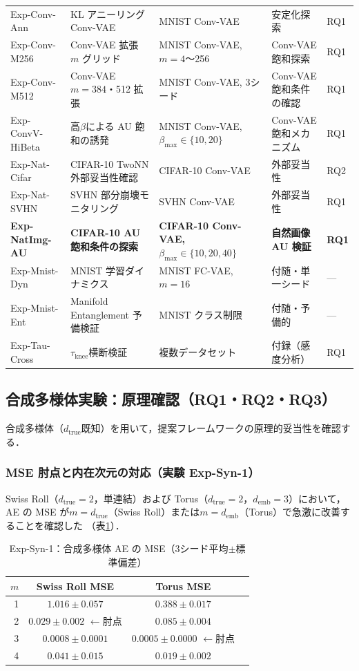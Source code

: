 \documentclass[11pt,a4paper]{jsarticle}
\newcommand{\dtrue}{d_{\mathrm{true}}}
\newcommand{\demb}{d_{\mathrm{emb}}}
\begin{document}
\begin{table}[H]
\begin{tabular}{lllll}
Exp-Conv-Ann & KL アニーリング Conv-VAE & MNIST Conv-VAE & 安定化探索 & RQ1 \\
Exp-Conv-M256 & Conv-VAE 拡張 $m$ グリッド & MNIST Conv-VAE, $m=4$〜256 & Conv-VAE 飽和探索 & RQ1 \\
Exp-Conv-M512 & Conv-VAE $m=384$・512 拡張 & MNIST Conv-VAE, 3シード & Conv-VAE 飽和条件の確認 & RQ1 \\
Exp-ConvV-HiBeta & 高$\beta$による AU 飽和の誘発 & MNIST Conv-VAE, $\beta_{\max}\in\{10,20\}$ & Conv-VAE 飽和メカニズム & RQ1 \\
Exp-Nat-Cifar & CIFAR-10 TwoNN 外部妥当性確認 & CIFAR-10 Conv-VAE & 外部妥当性 & RQ2 \\
Exp-Nat-SVHN & SVHN 部分崩壊モニタリング & SVHN Conv-VAE & 外部妥当性 & RQ1 \\
\textbf{Exp-NatImg-AU} & \textbf{CIFAR-10 AU 飽和条件の探索} & \textbf{CIFAR-10 Conv-VAE, $\beta_{\max}\in\{10,20,40\}$} & \textbf{自然画像 AU 検証} & \textbf{RQ1} \\
Exp-Mnist-Dyn & MNIST 学習ダイナミクス & MNIST FC-VAE, $m=16$ & 付随・単一シード & --- \\
Exp-Mnist-Ent & Manifold Entanglement 予備検証 & MNIST クラス制限 & 付随・予備的 & --- \\
Exp-Tau-Cross & $\tau_\mathrm{knee}$横断検証 & 複数データセット & 付録（感度分析） & RQ1 \\
\bottomrule
\end{tabular}
\end{table}

\subsection{合成多様体実験：原理確認（RQ1・RQ2・RQ3）}\label{sec:exp_synthetic}

合成多様体（$\dtrue$既知）を用いて，提案フレームワークの原理的妥当性を確認する．

\subsubsection{MSE 肘点と内在次元の対応（実験 Exp-Syn-1）}

Swiss Roll（$\dtrue = 2$，単連結）および Torus（$\dtrue = 2$，$\demb = 3$）において，
AE の MSE が$m = \dtrue$（Swiss Roll）または$m = \demb$（Torus）で急激に改善することを確認した
（表\ref{tab:e1}）．

\begin{table}[H]
\centering
\caption{Exp-Syn-1：合成多様体 AE の MSE（3シード平均$\pm$標準偏差）}
\label{tab:e1}
\small
\begin{tabular}{rccc}
\toprule
$m$ & Swiss Roll MSE & Torus MSE \\
\midrule
1 & $1.016\pm0.057$ & $0.388\pm0.017$ \\
2 & $\boldsymbol{0.029\pm0.002}$ $\leftarrow$肘点 & $0.085\pm0.004$ \\
3 & $0.0008\pm0.0001$ & $\boldsymbol{0.0005\pm0.0000}$ $\leftarrow$肘点 \\
4 & $0.041\pm0.015$ & $0.019\pm0.002$ \\
\bottomrule
\end{tabular}
\end{table}
\end{document}
